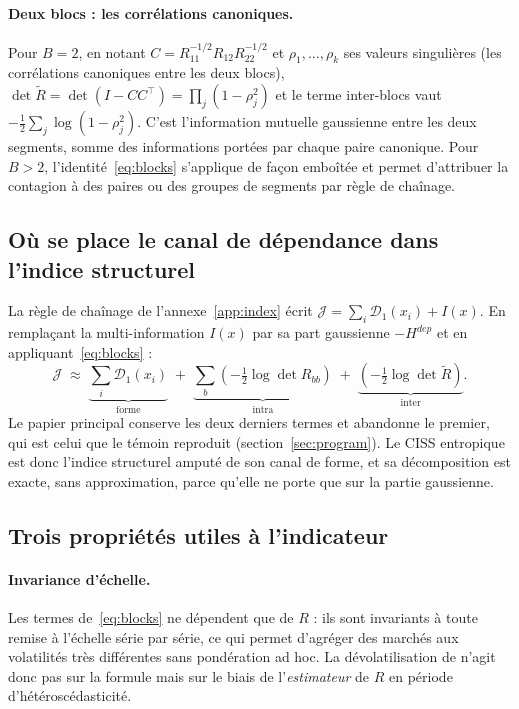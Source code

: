 \documentclass[11pt]{article}
\theoremstyle{definition}
\theoremstyle{remark}
\newcommand{\JJ}{\mathcal{J}}
\newcommand{\Dun}{\mathcal{D}_1}
\begin{document}
\paragraph{Deux blocs : les corrélations canoniques.} Pour $B=2$, en notant
$C=R_{11}^{-1/2}R_{12}R_{22}^{-1/2}$ et $\rho_1,\dots,\rho_k$ ses valeurs
singulières (les corrélations canoniques entre les deux blocs),
$\det\tilde R=\det(I-CC^\top)=\prod_j(1-\rho_j^2)$ et le terme inter-blocs vaut
$-\tfrac12\sum_j\log(1-\rho_j^2)$. C'est l'information mutuelle gaussienne
entre les deux segments, somme des informations portées par chaque paire
canonique. Pour $B>2$, l'identité~\eqref{eq:blocks} s'applique de façon
emboîtée et permet d'attribuer la contagion à des paires ou des groupes de
segments par règle de chaînage.

\subsection{Où se place le canal de dépendance dans l'indice structurel}

La règle de chaînage de l'annexe~\ref{app:index} écrit
$\JJ=\sum_i\Dun(x_i)+I(x)$. En remplaçant la multi-information $I(x)$ par sa
part gaussienne $-H^{dep}$ et en appliquant~\eqref{eq:blocks} :
\begin{equation}
\label{eq:jblocks}
\JJ\;\approx\;\underbrace{\sum_i\Dun(x_i)}_{\text{forme}}
\;+\;\underbrace{\sum_b\left(-\tfrac12\log\det R_{bb}\right)}_{\text{intra}}
\;+\;\underbrace{\left(-\tfrac12\log\det\tilde R\right)}_{\text{inter}} .
\end{equation}
Le papier principal conserve les deux derniers termes et abandonne le premier,
qui est celui que le témoin reproduit (section~\ref{sec:program}). Le CISS
entropique est donc l'indice structurel amputé de son canal de forme, et sa
décomposition est exacte, sans approximation, parce qu'elle ne porte que sur la
partie gaussienne.

\subsection{Trois propriétés utiles à l'indicateur}

\paragraph{Invariance d'échelle.} Les termes de~\eqref{eq:blocks} ne dépendent
que de $R$ : ils sont invariants à toute remise à l'échelle série par série,
ce qui permet d'agréger des marchés aux volatilités très différentes sans
pondération ad hoc. La dévolatilisation de \citet{forbes2002} n'agit donc pas
sur la formule mais sur le biais de l'\emph{estimateur} de $R$ en période
d'hétéroscédasticité.
\end{document}

